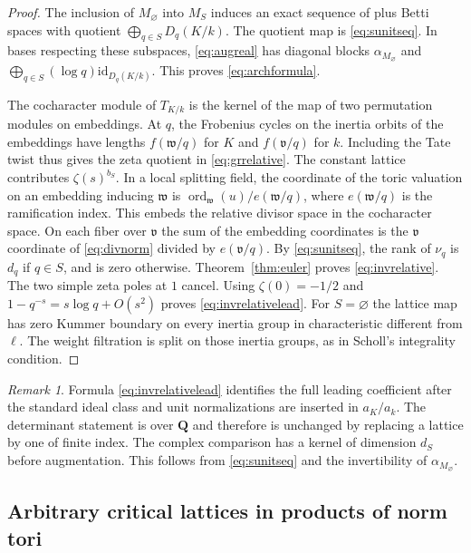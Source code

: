 \documentclass[11pt]{amsart}
\numberwithin{equation}{section}
\theoremstyle{definition}
\theoremstyle{remark}
\newtheorem{remark}[theorem]{Remark}
\newcommand{\Q}{\mathbf Q}
\newcommand{\ord}{\operatorname{ord}}
\begin{document}
\begin{proof}
The inclusion of $M_\varnothing$ into $M_S$ induces an
exact sequence of plus Betti spaces with quotient
$\bigoplus_{q\in S}D_q(K/k)$. The quotient map is
\eqref{eq:sunitseq}. In bases respecting these subspaces,
\eqref{eq:augreal} has diagonal blocks
$\alpha_{M_\varnothing}$ and
$\bigoplus_{q\in S}(\log q)\mathrm{id}_{D_q(K/k)}$.
This proves \eqref{eq:archformula}.

The cocharacter module of $T_{K/k}$ is the kernel of the
map of two permutation modules on embeddings. At $q$, the
Frobenius cycles on the inertia orbits of the embeddings
have lengths $f(\mathfrak w/q)$ for $K$ and
$f(\mathfrak v/q)$ for $k$. Including the Tate twist thus
gives the zeta quotient in \eqref{eq:grrelative}.
The constant lattice contributes $\zeta(s)^{b_S}$.
In a local splitting field, the coordinate of the toric
valuation on an embedding inducing $\mathfrak w$ is
$\ord_{\mathfrak w}(u)/e(\mathfrak w/q)$, where
$e(\mathfrak w/q)$ is the ramification index. This embeds
the relative divisor space in the cocharacter space.
On each fiber over $\mathfrak v$ the sum of the embedding
coordinates is the $\mathfrak v$ coordinate of
\eqref{eq:divnorm} divided by $e(\mathfrak v/q)$.
By \eqref{eq:sunitseq}, the rank of $\nu_q$ is $d_q$
if $q\in S$, and is zero otherwise. Theorem~\ref{thm:euler}
proves \eqref{eq:invrelative}. The two simple zeta poles at
$1$ cancel. Using $\zeta(0)=-1/2$ and
$1-q^{-s}=s\log q+O(s^2)$ proves \eqref{eq:invrelativelead}.
For $S=\varnothing$ the lattice map has zero Kummer
boundary on every inertia group in characteristic
different from $\ell$. The weight filtration is split on
those inertia groups, as in Scholl's integrality condition.
\end{proof}

\begin{remark}
Formula \eqref{eq:invrelativelead} identifies the full leading
coefficient after the standard ideal class and unit normalizations
are inserted in $a_K/a_k$. The determinant statement is over
$\Q$ and therefore is unchanged by replacing a lattice by one of
finite index. The complex comparison has a kernel of dimension
$d_S$ before augmentation. This follows from \eqref{eq:sunitseq}
and the invertibility of $\alpha_{M_\varnothing}$.
\end{remark}

\subsection{Arbitrary critical lattices in products of norm tori}
\label{subsec:allcritical}
\end{document}
